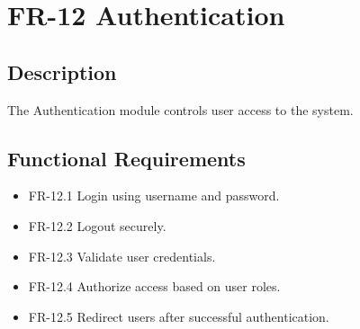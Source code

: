 \section{FR-12 Authentication}

\subsection*{Description}

The Authentication module controls user access to the system.

\subsection*{Functional Requirements}

\begin{itemize}
    \item FR-12.1 Login using username and password.
    \item FR-12.2 Logout securely.
    \item FR-12.3 Validate user credentials.
    \item FR-12.4 Authorize access based on user roles.
    \item FR-12.5 Redirect users after successful authentication.
\end{itemize}